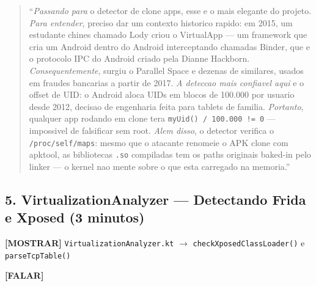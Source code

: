 \documentclass[12pt,a4paper]{article}
\begin{document}
\begin{quote}
``\textit{Passando para} o detector de clone apps, esse e o mais elegante do projeto.
\textit{Para entender}, preciso dar um contexto historico rapido:
em 2015, um estudante chines chamado Lody criou o VirtualApp ---
um framework que cria um Android dentro do Android interceptando chamadas Binder,
que e o protocolo IPC do Android criado pela Dianne Hackborn.
\textit{Consequentemente}, surgiu o Parallel Space e dezenas de similares,
usados em fraudes bancarias a partir de 2017.
\textit{A deteccao mais confiavel aqui} e o offset de UID:
o Android aloca UIDs em blocos de 100.000 por usuario desde 2012,
decisao de engenharia feita para tablets de familia.
\textit{Portanto}, qualquer app rodando em clone tera
\texttt{myUid() / 100.000 != 0} --- impossivel de falsificar sem root.
\textit{Alem disso}, o detector verifica o \texttt{/proc/self/maps}:
mesmo que o atacante renomeie o APK clone com apktool,
as bibliotecas \texttt{.so} compiladas tem os paths originais baked-in pelo linker ---
o kernel nao mente sobre o que esta carregado na memoria.''
\end{quote}

\vspace{0.3cm}

\subsection*{5. VirtualizationAnalyzer --- Detectando Frida e Xposed (3 minutos)}

\textbf{[MOSTRAR]} \texttt{VirtualizationAnalyzer.kt} $\to$ \texttt{checkXposedClassLoader()} e \texttt{parseTcpTable()}

\textbf{[FALAR]}
\end{document}
